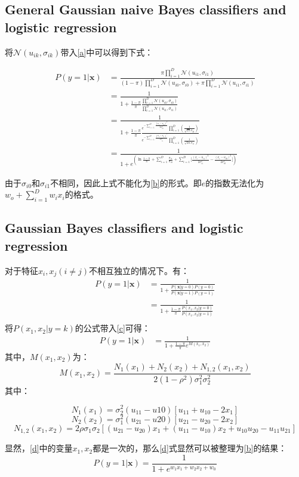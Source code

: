 \documentclass[12pt, letterpaper]{article}
\begin{document}
\subsection{General Gaussian naive Bayes classifiers and logistic regression}
将$\mathcal{N}(u_{ik},\sigma_{ik})$带入\ref{a}中可以得到下式：


\begin{equation}
\begin{aligned}
P(y=1|\mathbf{x})&=\frac{\pi\prod_{i=1}^D\mathcal{N}(u_{i1},\sigma_{i1})}{(1-\pi)\prod_{i=1}^D\mathcal{N}(u_{i0},\sigma_{i0})+\pi\prod_{i=1}^D\mathcal{N}(u_{i1},\sigma_{i1})}\\
&=\frac{1}{1+\frac{1-\pi}{\pi}\frac{\prod_{i=1}^D\mathcal{N}(u_{i0},\sigma_{i0})}{\prod_{i=1}^D\mathcal{N}(u_{i1},\sigma_{i1})}}\\
&=\frac{1}{1+\frac{1-\pi}{\pi}\frac{e^{-\sum_{i=1}^D\frac{(x_i-u_{i0})^2}{2\sigma_{i0}^2}}\prod_{i=1}^D(\frac{1}{\sqrt{2\pi}\sigma_{i0}})}{e^{-\sum_{i=1}^D\frac{(x_i-u_{i1})^2}{2\sigma_{i1}^2}}\prod_{i=1}^D(\frac{1}{\sqrt{2\pi}\sigma_{i1}})}}\\
&=\frac{1}{1+e^{(\ln{\frac{1-\pi}{\pi}+\sum_{i=1}^D\frac{\sigma_{i1}}{\sigma_{i0}}+\sum_{i=1}^D[\frac{(x_i-u_{i1})^2}{2\sigma^2_{i1}}-\frac{(x_i-u_{i0})^2}{2\sigma_{i0}^2}}])}}
\end{aligned}
\end{equation}

由于$\sigma_{i0}$和$\sigma_{i1}$不相同，因此上式不能化为\ref{b}的形式。即$e$的指数无法化为$w_o+\sum_{i=1}^Dw_ix_i$的格式。

\subsection{Gaussian Bayes classifiers and logistic regression}
对于特征$x_i,x_j(i\neq j)$不相互独立的情况下。有：
\begin{equation}
\begin{aligned}
P(y=1|\mathbf{x})&=\frac{1}{1+\frac{P(\mathbf{x}|y=0)P(y=0)}{P(\mathbf{x}|y=1)P(y=1)}}\\
&=\frac{1}{1+\frac{1-\pi}{\pi}\frac{P(x_1,x_2|y=0)}{P(x_1,x_2|y=1)}}\\
\label{c}
\end{aligned}
\end{equation}
将$P(x_1,x_2|y=k)$的公式带入\ref{c}可得：
\begin{equation}
\begin{aligned}
P(y=1|\mathbf{x})&=\frac{1}{1+\frac{1-\pi}{\pi}e^{M(x_1,x_2)}}
\label{d}
\end{aligned}
\end{equation}
其中，$M(x_1,x_2)$为：
$$
M(x_1,x_2)=
\frac{N_1(x_1)+N_2(x_2)+N_{1,2}(x_1,x_2)}{2(1-\rho^2)\sigma_1^2\sigma_2^2}
$$
其中：

$$
N_1(x_1)=\sigma_2^2(u_{11}-u{10})[u_{11}+u_{10}-2x_1]
$$
$$
N_2(x_2)=\sigma_1^2(u_{21}-u{20})[u_{21}-u_{20}-2x_2]
$$
$$
N_{1,2}(x_1,x_2)=2\rho\sigma_1\sigma_2[(u_{21}-u_{20})x_1+(u_{11}-u_{10})x_2+u_{10}u_{20}-u_{11}u_{21}]
$$

显然，\ref{d}中的变量$x_1,x_2$都是一次的，那么\ref{d}式显然可以被整理为\ref{b}的结果：
\begin{equation}
P(y=1|\mathbf{x})=\frac{1}{1+e^{w_1x_1+w_2x_2+w_0}}
\end{equation}
\end{document}
